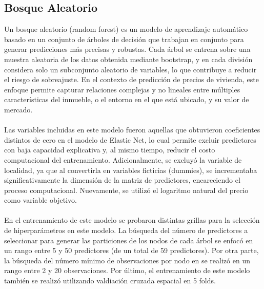 \documentclass[article,11 pt]{article}
\begin{document}
\subsection{Bosque Aleatorio}
Un bosque aleatorio (random forest) es un modelo de aprendizaje automático basado en un conjunto de árboles de decisión que trabajan en conjunto para generar predicciones más precisas y robustas. Cada árbol se entrena sobre una muestra aleatoria de los datos obtenida mediante bootstrap, y en cada división considera solo un subconjunto aleatorio de variables, lo que contribuye a reducir el riesgo de sobreajuste. En el contexto de predicción de precios de vivienda, este enfoque permite capturar relaciones complejas y no lineales entre múltiples características del inmueble, o el entorno en el que está ubicado, y su valor de mercado.
\\
\\
Las variables incluidas en este modelo fueron aquellas que obtuvieron coeficientes distintos de cero en el modelo de Elastic Net, lo cual permite excluir predictores con baja capacidad explicativa y, al mismo tiempo, reducir el costo computacional del entrenamiento. Adicionalmente, se excluyó la variable de localidad, ya que al convertirla en variables ficticias (dummies), se incrementaba significativamente la dimensión de la matriz de predictores, encareciendo el proceso computacional. Nuevamente, se utilizó el logaritmo natural del precio como variable objetivo. 
\\
\\
En el entrenamiento de este modelo se probaron distintas grillas para la selección de hiperparámetros en este modelo. La búsqueda del número de predictores a seleccionar para generar las particiones de los nodos de cada árbol se enfocó en un rango entre 5 y 50 predictores (de un total de 59 predictores). Por otra parte, la búsqueda del número mínimo de observaciones por nodo en se realizó en un rango entre 2 y 20 observaciones. Por último, el entrenamiento de este modelo también se realizó utilizando valdiación cruzada espacial en 5 folds.
\\
\\
\end{document}
